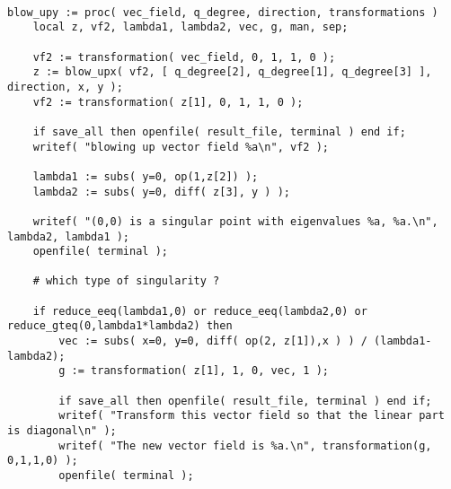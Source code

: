 \documentclass[a4paper,10pt]{article}
\begin{document}
\begin{lstlisting}[name=blowup]

blow_upy := proc( vec_field, q_degree, direction, transformations )
    local z, vf2, lambda1, lambda2, vec, g, man, sep;

    vf2 := transformation( vec_field, 0, 1, 1, 0 );
    z := blow_upx( vf2, [ q_degree[2], q_degree[1], q_degree[3] ], direction, x, y );
    vf2 := transformation( z[1], 0, 1, 1, 0 );

    if save_all then openfile( result_file, terminal ) end if;
    writef( "blowing up vector field %a\n", vf2 );

    lambda1 := subs( y=0, op(1,z[2]) );
    lambda2 := subs( y=0, diff( z[3], y ) );

    writef( "(0,0) is a singular point with eigenvalues %a, %a.\n", lambda2, lambda1 );
    openfile( terminal );

    # which type of singularity ?

    if reduce_eeq(lambda1,0) or reduce_eeq(lambda2,0) or reduce_gteq(0,lambda1*lambda2) then
        vec := subs( x=0, y=0, diff( op(2, z[1]),x ) ) / (lambda1-lambda2);
        g := transformation( z[1], 1, 0, vec, 1 );

        if save_all then openfile( result_file, terminal ) end if;
        writef( "Transform this vector field so that the linear part is diagonal\n" );
        writef( "The new vector field is %a.\n", transformation(g, 0,1,1,0) );
        openfile( terminal );


\end{lstlisting}
\end{document}

